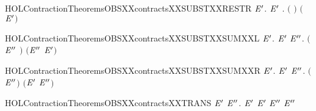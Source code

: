 \begin{SaveVerbatim}{HOLContractionTheoremsOBSXXcontractsXXSUBSTXXRESTR}
\HOLTokenTurnstile{} \HOLSymConst{\HOLTokenForall{}} \ensuremath{\HOLBoundVar{E}\sp{\prime}}.
         \ensuremath{\HOLBoundVar{E}\sp{\prime}} \HOLSymConst{\HOLTokenImp{}} \HOLSymConst{\HOLTokenForall{}}.  \ensuremath{(}  \ensuremath{)} \ensuremath{(}  \ensuremath{\HOLBoundVar{E}\sp{\prime}}\ensuremath{)}
\end{SaveVerbatim}
\newcommand{\HOLContractionTheoremsOBSXXcontractsXXSUBSTXXRESTR}{\UseVerbatim{HOLContractionTheoremsOBSXXcontractsXXSUBSTXXRESTR}}
\begin{SaveVerbatim}{HOLContractionTheoremsOBSXXcontractsXXSUBSTXXSUMXXL}
\HOLTokenTurnstile{} \HOLSymConst{\HOLTokenForall{}} \ensuremath{\HOLBoundVar{E}\sp{\prime}}.
         \ensuremath{\HOLBoundVar{E}\sp{\prime}} \HOLSymConst{\HOLTokenImp{}}
       \HOLSymConst{\HOLTokenForall{}}\ensuremath{\HOLBoundVar{E}\sp{\prime\prime}}.  \ensuremath{(}\ensuremath{\HOLBoundVar{E}\sp{\prime\prime}} \HOLSymConst{\ensuremath{+}} \ensuremath{)} \ensuremath{(}\ensuremath{\HOLBoundVar{E}\sp{\prime\prime}} \HOLSymConst{\ensuremath{+}} \ensuremath{\HOLBoundVar{E}\sp{\prime}}\ensuremath{)}
\end{SaveVerbatim}
\newcommand{\HOLContractionTheoremsOBSXXcontractsXXSUBSTXXSUMXXL}{\UseVerbatim{HOLContractionTheoremsOBSXXcontractsXXSUBSTXXSUMXXL}}
\begin{SaveVerbatim}{HOLContractionTheoremsOBSXXcontractsXXSUBSTXXSUMXXR}
\HOLTokenTurnstile{} \HOLSymConst{\HOLTokenForall{}} \ensuremath{\HOLBoundVar{E}\sp{\prime}}.
         \ensuremath{\HOLBoundVar{E}\sp{\prime}} \HOLSymConst{\HOLTokenImp{}}
       \HOLSymConst{\HOLTokenForall{}}\ensuremath{\HOLBoundVar{E}\sp{\prime\prime}}.  \ensuremath{(} \HOLSymConst{\ensuremath{+}} \ensuremath{\HOLBoundVar{E}\sp{\prime\prime}}\ensuremath{)} \ensuremath{(}\ensuremath{\HOLBoundVar{E}\sp{\prime}} \HOLSymConst{\ensuremath{+}} \ensuremath{\HOLBoundVar{E}\sp{\prime\prime}}\ensuremath{)}
\end{SaveVerbatim}
\newcommand{\HOLContractionTheoremsOBSXXcontractsXXSUBSTXXSUMXXR}{\UseVerbatim{HOLContractionTheoremsOBSXXcontractsXXSUBSTXXSUMXXR}}
\begin{SaveVerbatim}{HOLContractionTheoremsOBSXXcontractsXXTRANS}
\HOLTokenTurnstile{} \HOLSymConst{\HOLTokenForall{}} \ensuremath{\HOLBoundVar{E}\sp{\prime}} \ensuremath{\HOLBoundVar{E}\sp{\prime\prime}}.
         \ensuremath{\HOLBoundVar{E}\sp{\prime}} \HOLSymConst{\HOLTokenConj{}}  \ensuremath{\HOLBoundVar{E}\sp{\prime}} \ensuremath{\HOLBoundVar{E}\sp{\prime\prime}} \HOLSymConst{\HOLTokenImp{}}
         \ensuremath{\HOLBoundVar{E}\sp{\prime\prime}}
\end{SaveVerbatim}
